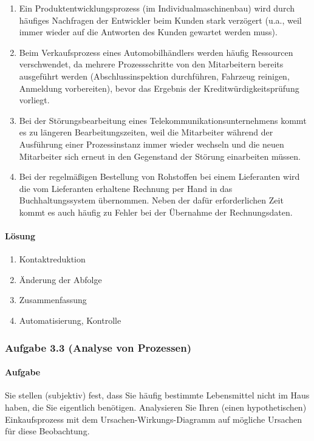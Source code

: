     \begin{enumerate}[label=\alph*)]
        \item Ein Produktentwicklungsprozess (im Individualmaschinenbau) wird durch häufiges Nachfragen der Entwickler beim Kunden stark verzögert (u.a., weil immer wieder auf die Antworten des Kunden gewartet werden muss).
        \item Beim Verkaufsprozess eines Automobilhändlers werden häufig Ressourcen verschwendet, da mehrere Prozessschritte von den Mitarbeitern bereits ausgeführt werden (Abschlussinspektion durchführen, Fahrzeug reinigen, Anmeldung vorbereiten), bevor das Ergebnis der Kreditwürdigkeitsprüfung vorliegt.
        \item Bei der Störungsbearbeitung eines Telekommunikationsunternehmens kommt es zu längeren Bearbeitungszeiten, weil die Mitarbeiter während der Ausführung einer Prozessinstanz immer wieder wechseln und die neuen Mitarbeiter sich erneut in den Gegenstand der Störung einarbeiten müssen.
        \item Bei der regelmäßigen Bestellung von Rohstoffen bei einem Lieferanten wird die vom Lieferanten erhaltene Rechnung per Hand in das Buchhaltungssystem übernommen. Neben der dafür erforderlichen Zeit kommt es auch häufig zu Fehler bei der Übernahme der Rechnungsdaten.
    \end{enumerate}

\paragraph*{Lösung}
    \begin{enumerate}[label=\alph*)]
        \item Kontaktreduktion
        \item Änderung der Abfolge
        \item Zusammenfassung
        \item Automatisierung, Kontrolle
    \end{enumerate}

\subsubsection*{Aufgabe 3.3 (Analyse von Prozessen)}
\paragraph*{Aufgabe}
    Sie stellen (subjektiv) fest, dass Sie häufig bestimmte Lebensmittel nicht im Haus haben, die Sie eigentlich benötigen. Analysieren Sie Ihren (einen hypothetischen) Einkaufsprozess mit dem Ursachen-Wirkungs-Diagramm auf mögliche Ursachen für diese Beobachtung.
